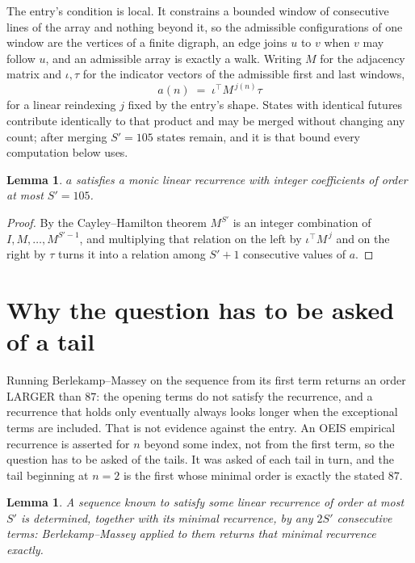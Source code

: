\documentclass[11pt,a4paper]{article}
\theoremstyle{plain}
\newtheorem{lemma}[theorem]{Lemma}
\theoremstyle{definition}
\begin{document}
The entry's condition is local. It constrains a bounded window of consecutive lines of the
array and nothing beyond it, so the admissible configurations of one window are the vertices of
a finite digraph, an edge joins $u$ to $v$ when $v$ may follow $u$, and an admissible array is
exactly a walk. Writing $M$ for the adjacency matrix and $\iota,\tau$ for the indicator vectors
of the admissible first and last windows,
\[
a(n)\;=\;\iota^{\!\top}M^{\,j(n)}\tau
\]
for a linear reindexing $j$ fixed by the entry's shape. States with identical futures
contribute identically to that product and may be merged without changing any count; after
merging $S'=105$ states remain, and it is that bound every computation below uses.

\begin{lemma}\label{lem:cf}
$a$ satisfies a monic linear recurrence with integer coefficients of order at most $S'=105$.
\end{lemma}

\begin{proof}
By the Cayley--Hamilton theorem $M^{S'}$ is an integer combination of $I,M,\dots,M^{S'-1}$,
and multiplying that relation on the left by $\iota^{\!\top}M^{\,j}$ and on the right by
$\tau$ turns it into a relation among $S'+1$ consecutive values of $a$.
\end{proof}

\section{Why the question has to be asked of a tail}

Running Berlekamp--Massey on the sequence from its first term returns an order LARGER than $87$: the opening terms do not satisfy the recurrence, and a recurrence that holds only eventually always looks longer when the exceptional terms are included. That is not evidence against the entry. An OEIS empirical recurrence is asserted for $n$ beyond some index, not from the first term, so the question has to be asked of the tails. It was asked of each tail in turn, and the tail beginning at $n=2$ is the first whose minimal order is exactly the stated $87$.

\begin{lemma}\label{lem:bm}
A sequence known to satisfy some linear recurrence of order at most $S'$ is determined,
together with its minimal recurrence, by any $2S'$ consecutive terms: Berlekamp--Massey applied
to them returns that minimal recurrence exactly.
\end{lemma}
\end{document}
